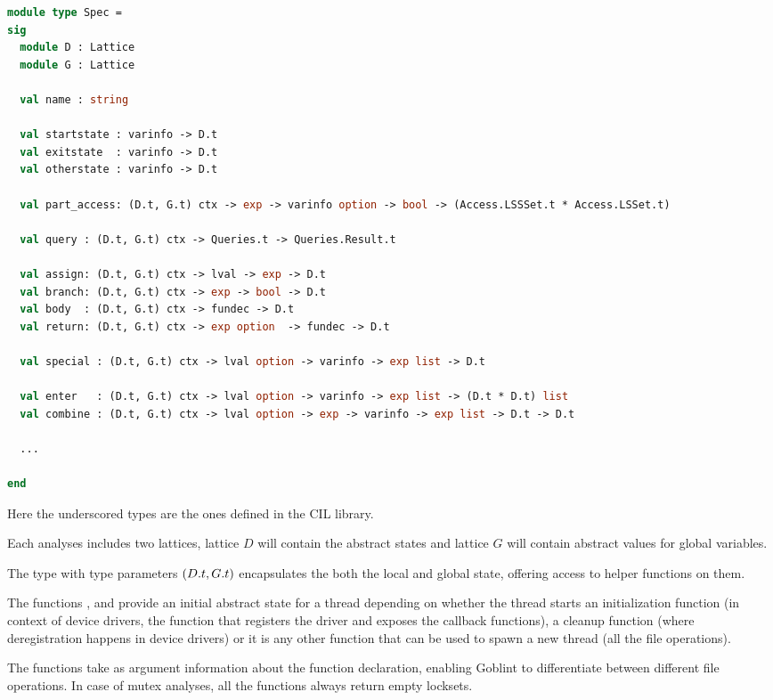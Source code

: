 \documentclass[..thesis.tex]{subfiles}
\begin{document}
\begin{lstlisting}[language=Caml,style=caml]
module type Spec =
sig
  module D : Lattice
  module G : Lattice

  val name : string

  val startstate : varinfo -> D.t
  val exitstate  : varinfo -> D.t
  val otherstate : varinfo -> D.t

  val part_access: (D.t, G.t) ctx -> exp -> varinfo option -> bool -> (Access.LSSSet.t * Access.LSSet.t)

  val query : (D.t, G.t) ctx -> Queries.t -> Queries.Result.t

  val assign: (D.t, G.t) ctx -> lval -> exp -> D.t
  val branch: (D.t, G.t) ctx -> exp -> bool -> D.t
  val body  : (D.t, G.t) ctx -> fundec -> D.t
  val return: (D.t, G.t) ctx -> exp option  -> fundec -> D.t

  val special : (D.t, G.t) ctx -> lval option -> varinfo -> exp list -> D.t

  val enter   : (D.t, G.t) ctx -> lval option -> varinfo -> exp list -> (D.t * D.t) list
  val combine : (D.t, G.t) ctx -> lval option -> exp -> varinfo -> exp list -> D.t -> D.t

  ...

end
\end{lstlisting}

Here the underscored types are the ones defined in the CIL library.

Each analyses includes two lattices, lattice $D$ will contain the abstract states and lattice $G$ will contain abstract values for global variables.

The type  with type parameters $\left( D.t, G.t \right)$ encapsulates the both the local and global state, offering access to helper functions on them. 

The functions , and  provide an initial abstract state for a thread depending on whether the thread starts an
initialization function (in context of device drivers, the function that registers the driver and exposes the callback functions),
a cleanup function (where deregistration happens in device drivers) or it is any other function that can be used to spawn a new thread (all the file operations).

The functions take as argument information about the function declaration, enabling Goblint to differentiate between different file operations.
In case of mutex analyses, all the functions always return empty locksets.
\end{document}
